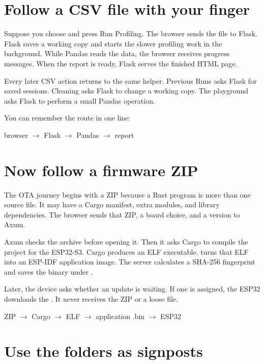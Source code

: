 \section{Follow a CSV file with your finger}

Suppose you choose  and press Run Profiling. The browser sends the file to Flask. Flask saves a working copy and starts the slower profiling work in the background. While Pandas reads the data, the browser receives progress messages. When the report is ready, Flask serves the finished HTML page.

Every later CSV action returns to the same helper. Previous Runs asks Flask for saved sessions. Cleaning asks Flask to change a working copy. The playground asks Flask to perform a small Pandas operation.

You can remember the route in one line:

\begin{center}
\ttfamily browser $\rightarrow$ Flask $\rightarrow$ Pandas $\rightarrow$ report
\end{center}

\section{Now follow a firmware ZIP}

The OTA journey begins with a ZIP because a Rust program is more than one source file. It may have a Cargo manifest, extra modules, and library dependencies. The browser sends that ZIP, a board choice, and a version to Axum.

Axum checks the archive before opening it. Then it asks Cargo to compile the project for the ESP32-S3. Cargo produces an ELF executable.  turns that ELF into an ESP-IDF application image. The server calculates a SHA-256 fingerprint and saves the binary under .

Later, the device asks whether an update is waiting. If one is assigned, the ESP32 downloads the . It never receives the ZIP or a loose  file.

\begin{center}
\ttfamily ZIP $\rightarrow$ Cargo $\rightarrow$ ELF $\rightarrow$ application .bin $\rightarrow$ ESP32
\end{center}

\section{Use the folders as signposts}

